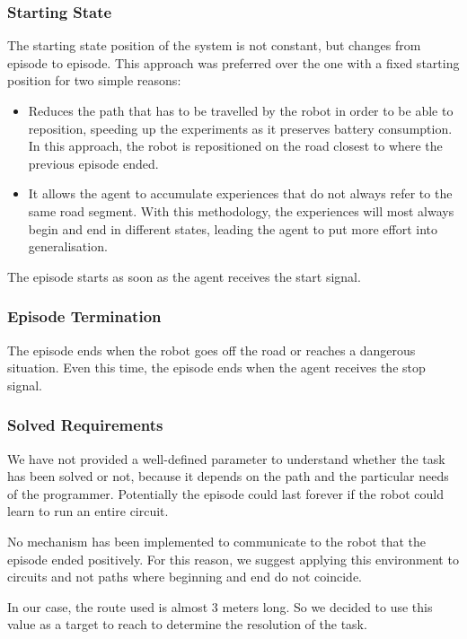 \subsubsection{Starting State}

The starting state position of the system is not constant, but changes from episode to episode.
This approach was preferred over the one with a fixed starting position for two simple reasons:
\begin{itemize}
    \item Reduces the path that has to be travelled by the robot in order to be able to reposition, speeding up the experiments as it preserves battery consumption.
          In this approach, the robot is repositioned on the road closest to where the previous episode ended.
    \item It allows the agent to accumulate experiences that do not always refer to the same road segment.
          With this methodology, the experiences will most always begin and end in different states, leading the agent to put more effort into generalisation.
\end{itemize}

The episode starts as soon as the agent receives the start signal.

\subsubsection{Episode Termination}

The episode ends when the robot goes off the road or reaches a dangerous situation.
Even this time, the episode ends when the agent receives the stop signal.

\subsubsection{Solved Requirements}

We have not provided a well-defined parameter to understand whether the task has been solved or not, because it depends on the path and the particular needs of the programmer.
Potentially the episode could last forever if the robot could learn to run an entire circuit.

No mechanism has been implemented to communicate to the robot that the episode ended positively.
For this reason, we suggest applying this environment to circuits and not paths where beginning and end do not coincide.

In our case, the route used is almost 3 meters long.
So we decided to use this value as a target to reach to determine the resolution of the task.

